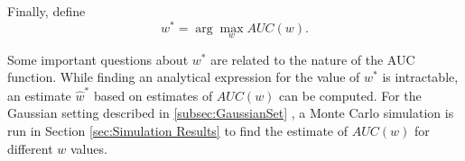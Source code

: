 \documentclass[12pt]{article} %
\begin{document}
 Finally, define $$w^{*}=\arg\max_w{AUC\left( w\right)}. $$

 Some important questions about $w^*$ are  related to the nature of the AUC function.
While finding an analytical expression for the value of $w^*$ is intractable, an estimate $\hat{w}^*$  based on  estimates of $AUC(w)$ %
 can be computed.  For the Gaussian setting described in \ref{subsec:GaussianSet} , a Monte Carlo simulation is run in  Section  \ref{sec:Simulation Results} to find the estimate of $AUC(w)$ for different $w$ values.
\end{document}
